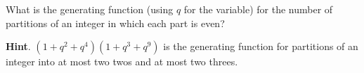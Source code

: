 \documentclass{book}
\begin{document}
\setcounter{cpjt}{321}
\addtocounter{cpjt}{-1}
\begin{activity}\label{activity-314}
\hypertarget{p-1595}{}%
What is the generating function (using \(q\) for the variable) for the number of partitions of an integer in which each part is even?%
\par\smallskip%
\noindent\textbf{Hint}.\hypertarget{hint-212}{}\quad%
\hypertarget{p-1596}{}%
\((1 + q^2 + q^4 )(1 + q^3 + q^9 )\) is the generating function for partitions of an integer into at most two twos and at most two threes.%
\par\smallskip%
\noindent\end{activity}

\clearpage
\end{document}
